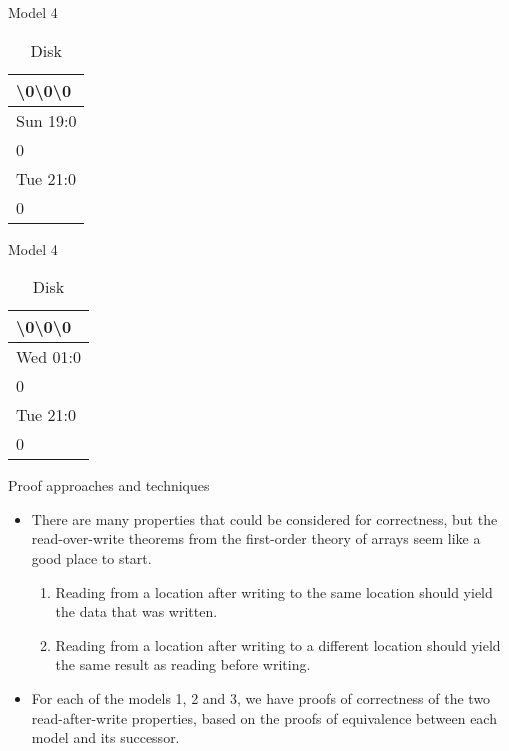 \documentclass{beamer}
\begin{document}
\begin{frame}{Model 4}
  \begin{figure}
    \def\svgwidth{0.7\columnwidth}
    
  \end{figure}
  \begin{table}[]
    \centering
    \caption{Disk}
    \label{my-label}
    \begin{tabular}{|l|}
      \hline
      \textbackslash0\textbackslash0\textbackslash0   \\ \hline
      Sun 19:0 \\ \hline
      0        \\ \hline
      Tue 21:0 \\ \hline
      0        \\ \hline
    \end{tabular}
  \end{table}
\end{frame}

\begin{frame}{Model 4}
  \begin{figure}
    \def\svgwidth{0.7\columnwidth}
    
  \end{figure}
  \begin{table}[]
    \centering
    \caption{Disk}
    \label{my-label}
    \begin{tabular}{|l|}
      \hline
      \textbackslash0\textbackslash0\textbackslash0   \\ \hline
      Wed 01:0 \\ \hline
      0        \\ \hline
      Tue 21:0 \\ \hline
      0        \\ \hline
    \end{tabular}
  \end{table}
\end{frame}

\begin{frame}{Proof approaches and techniques}
  \begin{itemize}
  \item There are many properties that could be considered for
    correctness, but the read-over-write theorems from the first-order
    theory of arrays seem like a good place to start.
    \begin {enumerate}
    \item Reading from a location after writing to the same location
      should yield the data that was written.
    \item Reading from a location after writing to a different
      location should yield the same result as reading before writing.
    \end {enumerate}
    \item For each of the models 1, 2 and 3, we have proofs of correctness of
      the two read-after-write properties, based on the proofs of
      equivalence between each model and its successor.
  \end{itemize}
\end{frame}
\end{document}
